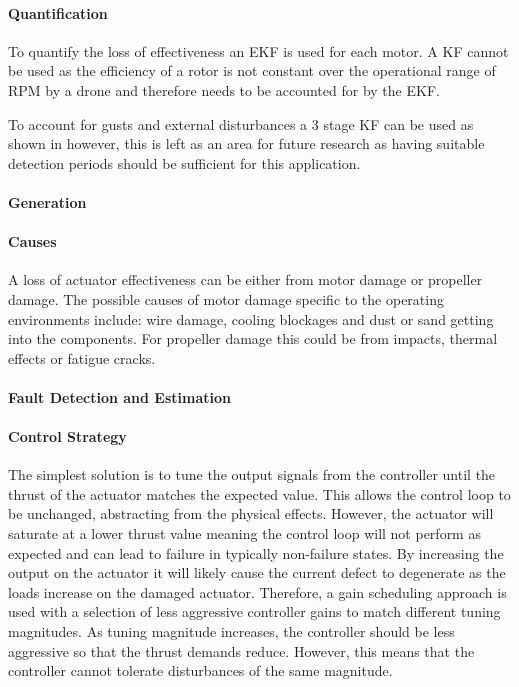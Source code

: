 \paragraph{Quantification}
To quantify the loss of effectiveness an \gls{EKF} is used for each motor. A \gls{KF} cannot be used as the efficiency of a rotor is not constant over the operational range of RPM by a drone and therefore needs to be accounted for by the \gls{EKF}.

To account for gusts and external disturbances a 3 stage \gls{KF} can be used as shown in \cite{3KF} however, this is left as an area for future research as having suitable detection periods should be sufficient for this application.
\paragraph{Generation}

\paragraph{Causes}
A loss of actuator effectiveness can be either from motor damage or propeller damage. The possible causes of motor damage specific to the operating environments include: wire damage, cooling blockages and dust or sand getting into the components. For propeller damage this could be from impacts, thermal effects or fatigue cracks.
\paragraph{Fault Detection and Estimation}
\paragraph{Control Strategy}
The simplest solution is to tune the output signals from the controller until the thrust of the actuator matches the expected value. This allows the control loop to be unchanged, abstracting from the physical effects. However, the actuator will saturate at a lower thrust value meaning the control loop will not perform as expected and can lead to failure in typically non-failure states. By increasing the output on the actuator it will likely cause the current defect to degenerate as the loads increase on the damaged actuator. Therefore, a gain scheduling approach is used with a selection of less aggressive controller gains to match different tuning magnitudes. As tuning magnitude increases, the controller should be less aggressive so that the thrust demands reduce. However, this means that the controller cannot tolerate disturbances of the same magnitude. 